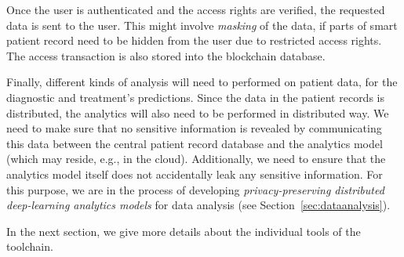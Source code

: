 Once the user is authenticated and the access rights are verified, the requested data is sent to the user. This might involve \emph{masking} of the data, if parts of smart patient record need to be hidden from the user due to restricted access rights. The access transaction is also stored into the blockchain database.

Finally, different kinds of analysis will need to performed on patient data, for the diagnostic and treatment's predictions. Since the data in the patient records is distributed, the analytics will also need to be performed in distributed way. We need to make sure that no sensitive information is revealed by communicating this data between the central patient record database and the analytics model (which may reside, e.g., in the cloud). Additionally, we need to ensure that the analytics model itself does not accidentally leak any sensitive information. For this purpose, we are in the process of developing \emph{privacy-preserving distributed deep-learning analytics models} for data analysis (see Section~\ref{sec:dataanalysis}).

In the next section, we give more details about the individual tools of the toolchain.








